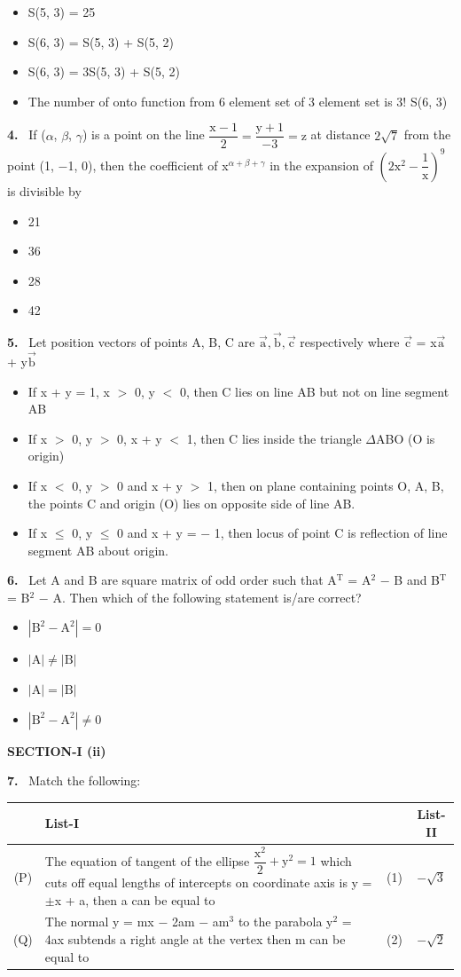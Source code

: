 \documentclass[10pt]{extarticle}
\newcommand{\sect}[1]{\par\smallskip\noindent\textbf{#1}\par}
\newcommand{\qn}[1]{\par\smallskip\noindent\textbf{#1.}~}
\newenvironment{qoptions}{\begin{itemize}[leftmargin=1.8em,itemsep=1pt,topsep=2pt,label={}]}{\end{itemize}}
\newcommand{\opt}[2]{\item[(#1)] #2}
\begin{document}
\begin{multicols}{2}
\begin{qoptions}
\opt{A}{S(5, 3) = 25}
\opt{B}{S(6, 3) = S(5, 3) + S(5, 2)}
\opt{C}{S(6, 3) = 3S(5, 3) + S(5, 2)}
\opt{D}{The number of onto function from 6 element set of 3 element set is 3! S(6, 3)}
\end{qoptions}
\qn{4} If ($\alpha$, $\beta$, $\gamma$) is a point on the line $\dfrac{\text{x}-1}{2}=\dfrac{\text{y}+1}{-3}=\text{z}$ at distance $2\sqrt{7}$ from the point (1, $-$1, 0), then the coefficient of x$^{\alpha+\beta+\gamma}$ in the expansion of $\left(2\text{x}^2-\dfrac{1}{\text{x}}\right)^9$ is divisible by
\begin{qoptions}
\opt{A}{21}
\opt{B}{36}
\opt{C}{28}
\opt{D}{42}
\end{qoptions}
\qn{5} Let position vectors of points A, B, C are $\vec{\text{a}},\vec{\text{b}},\vec{\text{c}}$ respectively where $\vec{\text{c}}$ = x$\vec{\text{a}}$ + y$\vec{\text{b}}$
\begin{qoptions}
\opt{A}{If x + y = 1, x $>$ 0, y $<$ 0, then C lies on line AB but not on line segment AB}
\opt{B}{If x $>$ 0, y $>$ 0, x + y $<$ 1, then C lies inside the triangle $\Delta$ABO (O is origin)}
\opt{C}{If x $<$ 0, y $>$ 0 and x + y $>$ 1, then on plane containing points O, A, B, the points C and origin (O) lies on opposite side of line AB.}
\opt{D}{If x $\leq$ 0, y $\leq$ 0 and x + y = $-$ 1, then locus of point C is reflection of line segment AB about origin.}
\end{qoptions}
\qn{6} Let A and B are square matrix of odd order such that A$^\text{T}$ = A$^2$ $-$ B and B$^\text{T}$ = B$^2$ $-$ A. Then which of the following statement is/are correct?
\begin{qoptions}
\opt{A}{$\left|\text{B}^2-\text{A}^2\right|=0$}
\opt{B}{$|\text{A}|\neq|\text{B}|$}
\opt{C}{$|\text{A}|=|\text{B}|$}
\opt{D}{$\left|\text{B}^2-\text{A}^2\right|\neq0$}
\end{qoptions}
\sect{SECTION-I (ii)}
\qn{7} Match the following:\par
{\footnotesize\setlength{\tabcolsep}{1.5pt}\noindent\begin{tabular}{|c|L{4.6cm}|c|c|}
\hline
 & List-I & & List-II \\
\hline
(P) & The equation of tangent of the ellipse $\dfrac{\text{x}^2}{2}+\text{y}^2=1$ which cuts off equal lengths of intercepts on coordinate axis is y = $\pm$x + a, then a can be equal to & (1) & $-\sqrt{3}$ \\
\hline
(Q) & The normal y = mx $-$ 2am $-$ am$^3$ to the parabola y$^2$ = 4ax subtends a right angle at the vertex then m can be equal to & (2) & $-\sqrt{2}$ \\

\end{tabular}}
\end{multicols}
\end{document}
